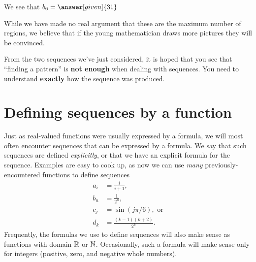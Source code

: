 \documentclass{ximera}
\begin{document}
\begin{example}
\begin{explanation}
\begin{itemize}
 We see that $b_6 = \answer[given]{31}$
    \end{itemize}
    While we have made no real argument that these are the maximum
    number of regions, we believe that if the young mathematician draws
    more pictures they will be convinced.
  \end{explanation}
\end{example}


From the two sequences we've just considered, it is hoped that you see that ``finding a
pattern'' is \textbf{not enough} when dealing with sequences. You need
to understand \textbf{exactly} how the sequence was produced.




\section{Defining sequences by a function}

Just as real-valued functions were usually expressed by a formula, we
will most often encounter sequences that can be expressed by a
formula.  We say that such sequences are defined \textit{explicitly}, 
or that we have an explicit formula for the sequence.
Examples are easy to cook up, as now we can use \textit{many} previously-encountered functions
to define sequences
\begin{align*}
  a_i &=\frac{i}{i+1}, \\
  b_n &=\frac{1}{2^n}, \\
  c_j &=\sin(j\pi/6), \text{ or} \\
  d_k &=\frac{(k-1)(k+2)}{2^k}. 
\end{align*}
Frequently, the formulas we use to define sequences will also make sense as
functions with domain $\mathbb R$ or $\mathbb N$.  Occasionally, such a 
formula will make sense only for integers (positive, zero, and
negative whole numbers).
\end{document}
